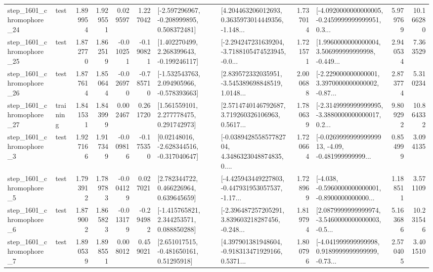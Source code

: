 \begin{tabular}{llrrrrllrlrr}
 step\_1601\_chromophore\_24 &      test &      1.899954 &    1.929551 &      0.029597 &  1.227042 &   [-2.597296967, -0.208999895, 0.508372481] &  [4.204463206012693, 0.3635973014449356, -1.148... &       1.737014 &  [-4.0920000000000005, -0.2459999999999951, 0.3... &            5.979769 &         10.166280 \\
 step\_1601\_chromophore\_25 &      test &      1.872770 &    1.862519 &     -0.010251 & -0.190821 &    [1.402270499, 2.268399643, -0.199246117] &  [-2.294247231639204, -3.7188105474523945, -0.0... &       1.721571 &  [1.9960000000000004, 3.506999999999998, -0.449... &            2.940534 &          7.363529 \\
 step\_1601\_chromophore\_26 &      test &      1.877614 &    1.850644 &     -0.026970 & -0.785710 &   [-1.532543763, 2.094905966, -0.578393663] &  [2.839572332035951, -3.545389698848519, 1.0148... &       2.000688 &  [-2.229000000000001, 3.3970000000000002, -0.87... &            2.873774 &          5.310234 \\
 step\_1601\_chromophore\_27 &  training &      1.841531 &    1.843999 &      0.002467 &  0.261720 &     [1.561559101, 2.277778475, 0.291742973] &  [2.5714740146792687, 3.719260326106963, 0.5617... &       1.780639 &  [-2.3149999999999995, -3.3880000000000017, 0.2... &            9.809292 &         10.864332 \\
  step\_1601\_chromophore\_3 &      test &      1.927166 &    1.917349 &     -0.009816 & -0.175350 &    [0.02148016, -2.628344516, -0.317040647] &  [-0.038942855857782704, 4.3486323048874835, 0.... &       1.720664 &  [-0.026999999999999913, -4.09, -0.481999999999... &            0.854999 &          3.094135 \\
  step\_1601\_chromophore\_5 &      test &      1.793912 &    1.789783 &     -0.004129 &  0.027021 &     [2.782344722, 0.466226964, 0.639645659] &  [-4.425943449227803, -0.447931953057537, -1.17... &       1.728969 &  [-4.038, -0.5960000000000001, -0.8900000000000... &            1.188511 &          3.571109 \\
  step\_1601\_chromophore\_6 &      test &      1.879002 &    1.865823 &     -0.013179 & -0.294982 &    [-1.415765821, 2.344253571, 0.088850288] &  [-2.396487257205291, 3.839603218287456, -0.248... &       1.819794 &  [2.0879999999999974, -3.5460000000000003, -0.5... &            5.163686 &         10.231546 \\
  step\_1601\_chromophore\_7 &      test &      1.890539 &    1.898551 &      0.008012 &  0.459021 &     [2.651017515, -0.481650161, 0.51295918] &  [4.397901381948604, -0.918313471929166, 0.5371... &       1.800796 &  [-4.041999999999998, 0.9189999999999999, -0.73... &            2.570405 &          3.401510 \\

\end{tabular}
